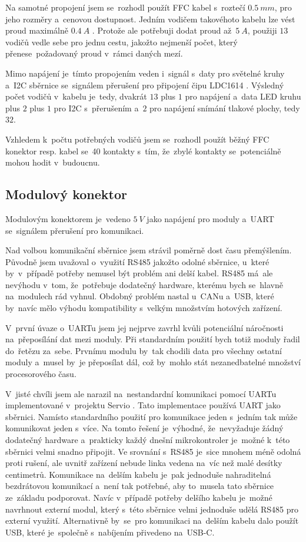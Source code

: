 Na samotné propojení jsem se~rozhodl použít FFC kabel s~roztečí \(0.5~mm\), pro jeho rozměry a~cenovou dostupnost.
Jedním vodičem takovéhoto kabelu lze vést proud maximálně \(0.4~A\) \cite{FFC-konektor}.
Protože ale potřebuji dodat proud až~\(5~A\), použiji \(13\) vodičů vedle sebe pro jednu cestu, jakožto nejmenší počet, který přenese~požadovaný proud v~rámci daných mezí.

Mimo napájení je~tímto propojením veden i~signál s~daty pro světelné kruhy a~I2C sběrnice se~signálem přerušení pro připojení čipu LDC1614 \cite{LDC1614}.
Výsledný počet vodičů v~kabelu je~tedy, dvakrát \(13\) plus \(1\) pro napájení a~data LED kruhu plus \(2\) plus \(1\) pro I2C s~přerušením a~\(2\) pro napájení snímání tlakové plochy, tedy \(32\).  

Vzhledem k~počtu potřebných vodičů jsem se~rozhodl použít běžný FFC konektor resp. kabel se~40 kontakty s~tím, že~zbylé kontakty se~potenciálně mohou hodit v~budoucnu.

\subsection{Modulový konektor \label{sec:ModulovyKonektor}}
Modulovým konektorem je~vedeno \(5~V\) jako napájení pro moduly a~UART se~signálem přerušení pro komunikaci.

Nad volbou komunikační sběrnice jsem strávil poměrně dost času přemýšlením.
Původně jsem uvažoval o~využití RS485 jakožto odolné sběrnice, u~které by~v~případě potřeby nemusel být problém ani delší kabel.
RS485 má~ale nevýhodu v~tom, že~potřebuje dodatečný hardware, kterému bych se~hlavně na~modulech rád vyhnul.
Obdobný problém nastal u~CANu a~USB, které by~navíc mělo výhodu kompatibility s~velkým množstvím hotových zařízení.

V~první úvaze o~UARTu jsem jej nejprve zavrhl kvůli potenciální náročnosti na~přeposílání dat mezi moduly.
Při standardním použití bych totiž moduly řadil do~řetězu za~sebe.
Prvnímu modulu by~tak chodili data pro všechny ostatní moduly a~musel by~je přeposílat dál, což by~mohlo stát nezanedbatelné množství procesorového času.

V~jisté chvíli jsem ale narazil na~nestandardní komunikaci pomocí UARTu implementované v~projektu Servio \cite{Servio}.
Tato implementace používá UART jako sběrnici.
Namísto standardního použití pro komunikace jeden s~jedním tak může komunikovat jeden s~více.
Na tomto řešení je~výhodné, že~nevyžaduje žádný dodatečný hardware a~prakticky každý dnešní mikrokontroler je~možné k~této sběrnici velmi snadno připojit.
Ve srovnání s~RS485 je~sice mnohem méně odolná proti rušení, ale uvnitř zařízení nebude linka vedena na~víc než malé desítky centimetrů.
Komunikace na~delším kabelu je~pak jednoduše nahraditelná bezdrátovou komunikací a~není tak potřebné, aby to~musela tato sběrnice ze~základu podporovat.
Navíc v~případě potřeby delšího kabelu je~možné navrhnout externí modul, který s~této sběrnice velmi jednoduše udělá RS485 pro externí využití.
Alternativně by~se~pro komunikaci na~delším kabelu dalo použít USB, které je~společně s~nabíjením přivedeno na~USB-C.

